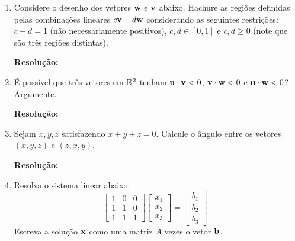 \documentclass[leqno]{article}
\numberwithin{equation}{section}
\newenvironment{sol}
{
    \vspace{4mm}
    \noindent\textbf{Resolução:}
    \strut\newline
    \smallskip
    \hspace{-3.5mm}
}
{}
\begin{document}
\begin{enumerate}
\item Considere o desenho dos vetores $\mathbf{w}$ e $\mathbf{v}$ abaixo. Hachure as regiões definidas pelas combinações lineares $c \mathbf{v} + d \mathbf{w}$ considerando as seguintes restrições: $c + d = 1$ (não necessariamente positivos), $c,d \in [0,1]$ e $c,d \geq 0$ (note que são três regiões distintas).

\begin{center}
\end{center} 

\begin{sol} 
\end{sol} 

\item É possível que três vetores em $\mathbb{R}^2$ tenham $\mathbf{u} \cdot \mathbf{v} < 0$, $\mathbf{v} \cdot \mathbf{w} < 0$ e $\mathbf{u} \cdot \mathbf{w} < 0$? Argumente.

\begin{sol} 
\end{sol} 

\item Sejam $x,y,z$ satisfazendo $x + y + z = 0$. Calcule o ângulo entre os vetores $(x,y,z)$ e $(z,x,y)$.

\begin{sol} 
\end{sol} 

\item Resolva o sistema linear abaixo:
$$\begin{bmatrix}
1 & 0 & 0\\
1 & 1 & 0\\
1 & 1 & 1
\end{bmatrix} \begin{bmatrix}
x_1\\
x_2\\
x_3
\end{bmatrix} = \begin{bmatrix}
b_1\\
b_2\\
b_3
\end{bmatrix}.$$
Escreva a solução $\mathbf{x}$ como uma matriz $A$ vezes o vetor $\mathbf{b}$.


\end{enumerate}
\end{document}
